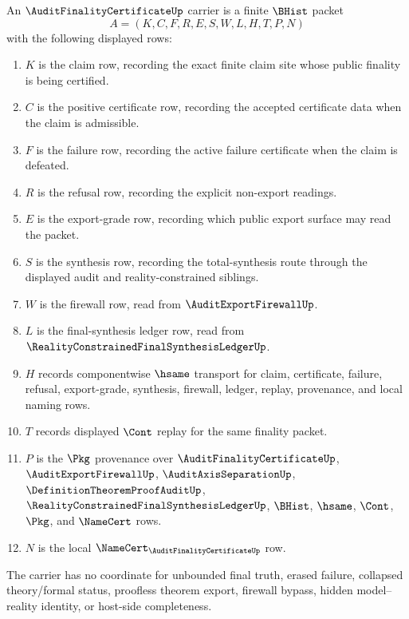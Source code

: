 \begin{definition}
\label{def:audit-finality-certificate-carrier}
An $\AuditFinalityCertificateUp$ carrier is a finite $\BHist$ packet
$$
A=(K,C,F,R,E,S,W,L,H,T,P,N)
$$
with the following displayed rows:
\begin{enumerate}
\item $K$ is the claim row, recording the exact finite claim site whose public finality is being certified.
\item $C$ is the positive certificate row, recording the accepted certificate data when the claim is admissible.
\item $F$ is the failure row, recording the active failure certificate when the claim is defeated.
\item $R$ is the refusal row, recording the explicit non-export readings.
\item $E$ is the export-grade row, recording which public export surface may read the packet.
\item $S$ is the synthesis row, recording the total-synthesis route through the displayed audit and reality-constrained siblings.
\item $W$ is the firewall row, read from $\AuditExportFirewallUp$.
\item $L$ is the final-synthesis ledger row, read from $\RealityConstrainedFinalSynthesisLedgerUp$.
\item $H$ records componentwise $\hsame$ transport for claim, certificate, failure, refusal, export-grade, synthesis, firewall, ledger, replay, provenance, and local naming rows.
\item $T$ records displayed $\Cont$ replay for the same finality packet.
\item $P$ is the $\Pkg$ provenance over $\AuditFinalityCertificateUp$, $\AuditExportFirewallUp$, $\AuditAxisSeparationUp$, $\DefinitionTheoremProofAuditUp$, $\RealityConstrainedFinalSynthesisLedgerUp$, $\BHist$, $\hsame$, $\Cont$, $\Pkg$, and $\NameCert$ rows.
\item $N$ is the local $\NameCert_{\AuditFinalityCertificateUp}$ row.
\end{enumerate}
The carrier has no coordinate for unbounded final truth, erased failure, collapsed theory/formal status, proofless theorem export, firewall bypass, hidden model--reality identity, or host-side completeness.
\end{definition}

